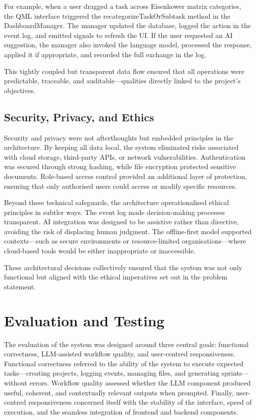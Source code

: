 \documentclass{report}
\begin{document}
For example, when a user dragged a task across Eisenhower matrix categories, the QML interface triggered the recategorizeTaskOrSubtask method in the DashboardManager. The manager updated the database, logged the action in the event log, and emitted signals to refresh the UI. If the user requested an AI suggestion, the manager also invoked the language model, processed the response, applied it if appropriate, and recorded the full exchange in the log.

This tightly coupled but transparent data flow ensured that all operations were predictable, traceable, and auditable—qualities directly linked to the project's objectives.

\section{Security, Privacy, and Ethics}

Security and privacy were not afterthoughts but embedded principles in the architecture. By keeping all data local, the system eliminated risks associated with cloud storage, third-party APIs, or network vulnerabilities. Authentication was secured through strong hashing, while file encryption protected sensitive documents. Role-based access control provided an additional layer of protection, ensuring that only authorised users could access or modify specific resources.

Beyond these technical safeguards, the architecture operationalised ethical principles in subtler ways. The event log made decision-making processes transparent. AI integration was designed to be assistive rather than directive, avoiding the risk of displacing human judgment. The offline-first model supported contexts—such as secure environments or resource-limited organisations—where cloud-based tools would be either inappropriate or inaccessible.

These architectural decisions collectively ensured that the system was not only functional but aligned with the ethical imperatives set out in the problem statement.


\chapter{Evaluation and Testing}  
The evaluation of the system was designed around three central goals: functional correctness, LLM-assisted workflow quality, and user-centred responsiveness. Functional correctness referred to the ability of the system to execute expected tasks—creating projects, logging events, managing files, and generating sprints—without errors. Workflow quality assessed whether the LLM component produced useful, coherent, and contextually relevant outputs when prompted. Finally, user-centred responsiveness concerned itself with the stability of the interface, speed of execution, and the seamless integration of frontend and backend components.
\end{document}
